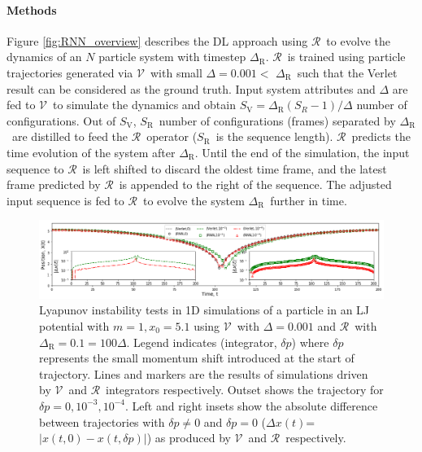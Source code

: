 \documentclass[aps,prl,twocolumn,superscriptaddress,tightenlines,longbibliography, reprint]{revtex4-1}
\newcommand{\dt}{$\Delta$}
\newcommand{\dtR}{$\Delta_{\textrm{R}}$}
\newcommand{\R}{$\mathscr{R}$}
\newcommand{\V}{$\mathscr{V}$}
\newcommand{\SV}{$S_{\mathrm{V}}$}
\newcommand{\SR}{$S_{\mathrm{R}}$}
\begin{document}
\paragraph{Methods}
Figure \ref{fig:RNN_overview} describes the DL approach using \R\ to evolve the dynamics of an $N$ particle system with timestep \dtR. 
\R\ is trained using particle trajectories generated via \V\ with small \dt $=0.001 <$ \dtR\ such that the Verlet result can be considered as the ground truth. 
Input system attributes and $\Delta$ are fed to \V\ to simulate the dynamics and obtain $S_{\mathrm{V}} = \Delta_{\mathrm{R}}(S_R - 1)/\Delta$ number of configurations. Out of \SV, \SR\ number of configurations (frames) separated by \dtR\ are distilled to feed the \R\ operator (\SR\ is the sequence length). \R\ predicts the time evolution of the system after \dtR. Until the end of the simulation, the input sequence to \R\ is left shifted to discard the oldest time frame, and the latest frame predicted by \R\ is appended to the right of the sequence. The adjusted input sequence is fed to \R\ to evolve the system \dtR\ further in time. 

\begin{figure}[hbt]
\centering
\includegraphics[width=1.0\textwidth]{figures/fig4.png}
\caption{Lyapunov instability tests in 1D simulations of a particle in an LJ potential with $m=1, x_0=5.1$ using \V\ with \dt $=0.001$ and \R\ with $\Delta_{\mathrm{R}}=0.1 = 100$\dt. Legend indicates (integrator, $\delta p$) where $\delta p$ represents the small momentum shift introduced at the start of trajectory. Lines and markers are the results of simulations driven by \V\ and \R\ integrators respectively. Outset shows the trajectory for $\delta p = 0, 10^{-3}, 10^{-4}$. Left and right insets show the absolute difference between trajectories with $\delta p \ne 0$ and $\delta p = 0$ ($\Delta x(t)$=$|x(t,0)-x(t,\delta p)|$) as produced by \V\ and \R\ respectively.
}
\label{fig:lyapunov}
\end{figure}
\end{document}
